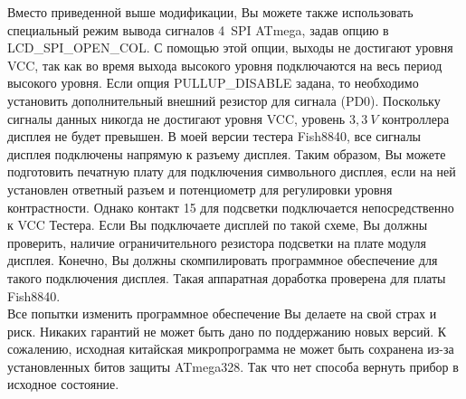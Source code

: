 Вместо приведенной выше модификации, Вы можете также использовать специальный режим вывода сигналов 
4~SPI ATmega, задав опцию в  LCD\_SPI\_OPEN\_COL.
С помощью этой опции, выходы не достигают уровня VCC, так как во время выхода высокого уровня 
подключаются  на весь период высокого уровня.
Если опция PULLUP\_DISABLE задана, то необходимо установить дополнительный внешний резистор для
сигнала  (PD0).
Поскольку сигналы данных никогда не достигают уровня VCC, уровень \(3,3~V\) контроллера дисплея не 
будет превышен.
В моей версии тестера Fish8840, все сигналы дисплея подключены напрямую к разъему дисплея.
Таким образом, Вы можете подготовить печатную плату для подключения символьного дисплея, если на ней установлен 
ответный разъем и потенциометр для регулировки уровня контрастности.
Однако контакт 15 для подсветки подключается непосредственно к VCC Тестера.
Если Вы подключаете дисплей по такой схеме, Вы должны проверить, наличие ограничительного резистора
подсветки на плате модуля дисплея.
Конечно, Вы должны скомпилировать программное обеспечение для такого подключения дисплея.
Такая аппаратная доработка проверена для платы Fish8840.\\

Все попытки изменить программное обеспечение Вы делаете на свой страх и риск.
Никаких гарантий не может быть дано по поддержанию новых версий.
К сожалению, исходная китайская микропрограмма не может быть сохранена 
из-за установленных битов защиты ATmega328. Так что нет способа вернуть прибор в исходное состояние.\\

